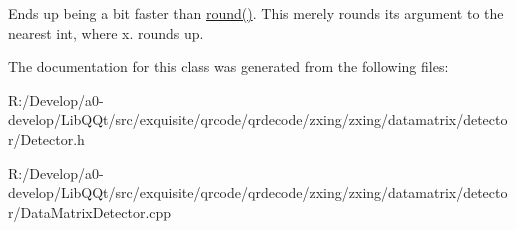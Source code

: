 Ends up being a bit faster than \mbox{\hyperlink{classzxing_1_1datamatrix_1_1_detector_a420331020a84da886b96d1184962bfd7}{round()}}. This merely rounds its argument to the nearest int, where x. rounds up. 

The documentation for this class was generated from the following files\+:\begin{DoxyCompactItemize}
\item 
R\+:/\+Develop/a0-\/develop/\+Lib\+Q\+Qt/src/exquisite/qrcode/qrdecode/zxing/zxing/datamatrix/detector/Detector.\+h\item 
R\+:/\+Develop/a0-\/develop/\+Lib\+Q\+Qt/src/exquisite/qrcode/qrdecode/zxing/zxing/datamatrix/detector/Data\+Matrix\+Detector.\+cpp\end{DoxyCompactItemize}
